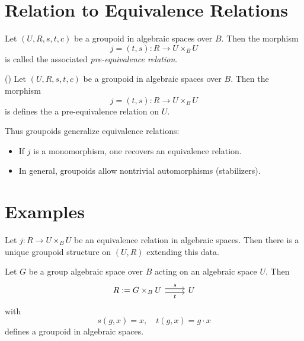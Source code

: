 \section{Relation to Equivalence Relations}

\begin{definition}
	Let $(U,R,s,t,c)$ be a groupoid in algebraic spaces over $B$. Then the morphism
	\[
	j = (t,s) : R \to U \times_B U
	\]
	is called the associated \emph{pre-equivalence relation}.
\end{definition}

\begin{lemma}
	(\cite[][Tag 043V]{stacks-project})
	Let $(U,R,s,t,c)$ be a groupoid in algebraic spaces over $B$. Then the morphism
	\[
	j = (t,s) : R \to U \times_B U
	\]
	is defines the a pre-equivalence relation on $U$.
\end{lemma}

\begin{remark}
	Thus groupoids generalize equivalence relations:
	\begin{itemize}
		\item If $j$ is a monomorphism, one recovers an equivalence relation.
		\item In general, groupoids allow nontrivial automorphisms (stabilizers).
	\end{itemize}
\end{remark}

\section{Examples}

\begin{example}
	Let $j : R \to U \times_B U$ be an equivalence relation in algebraic spaces.
	Then there is a unique groupoid structure on $(U,R)$ extending this data.
\end{example}

\begin{example}
	Let $G$ be a group algebraic space over $B$ acting on an algebraic space $U$.
	Then
	\[\begin{tikzcd}
		{R:= G\times_BU} & U
		\arrow["s", shift left, from=1-1, to=1-2]
		\arrow["t"', shift right, from=1-1, to=1-2]
	\end{tikzcd}\]
	with
	\[
	s(g,x) = x, \quad t(g,x) = g \cdot x
	\]
	defines a groupoid in algebraic spaces.
\end{example}

